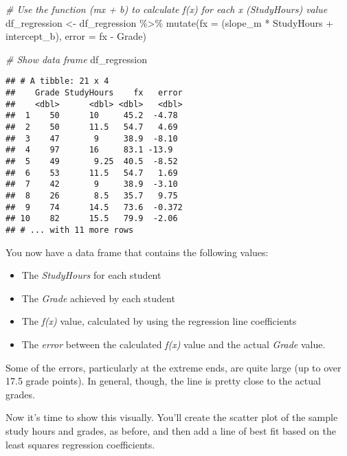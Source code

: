 \documentclass[
]{article}
\newenvironment{Shaded}{\begin{snugshade}}{\end{snugshade}}
\newcommand{\AttributeTok}[1]{\textcolor[rgb]{0.77,0.63,0.00}{#1}}
\newcommand{\CommentTok}[1]{\textcolor[rgb]{0.56,0.35,0.01}{\textit{#1}}}
\newcommand{\FunctionTok}[1]{\textcolor[rgb]{0.00,0.00,0.00}{#1}}
\newcommand{\NormalTok}[1]{#1}
\newcommand{\OtherTok}[1]{\textcolor[rgb]{0.56,0.35,0.01}{#1}}
\newcommand{\SpecialCharTok}[1]{\textcolor[rgb]{0.00,0.00,0.00}{#1}}
\providecommand{\tightlist}{%
  \setlength{\itemsep}{0pt}\setlength{\parskip}{0pt}}
\begin{document}
\begin{Shaded}
\begin{Highlighting}[]
\CommentTok{\# Use the function (mx + b) to calculate f(x) for each x (StudyHours) value}
\NormalTok{df\_regression }\OtherTok{\textless{}{-}}\NormalTok{ df\_regression }\SpecialCharTok{\%\textgreater{}\%} 
  \FunctionTok{mutate}\NormalTok{(}\AttributeTok{fx =}\NormalTok{ (slope\_m }\SpecialCharTok{*}\NormalTok{ StudyHours }\SpecialCharTok{+}\NormalTok{ intercept\_b),}
         \AttributeTok{error =}\NormalTok{ fx }\SpecialCharTok{{-}}\NormalTok{ Grade)}


\CommentTok{\# Show data frame}
\NormalTok{df\_regression}
\end{Highlighting}
\end{Shaded}

\begin{verbatim}
## # A tibble: 21 x 4
##    Grade StudyHours    fx   error
##    <dbl>      <dbl> <dbl>   <dbl>
##  1    50      10     45.2  -4.78 
##  2    50      11.5   54.7   4.69 
##  3    47       9     38.9  -8.10 
##  4    97      16     83.1 -13.9  
##  5    49       9.25  40.5  -8.52 
##  6    53      11.5   54.7   1.69 
##  7    42       9     38.9  -3.10 
##  8    26       8.5   35.7   9.75 
##  9    74      14.5   73.6  -0.372
## 10    82      15.5   79.9  -2.06 
## # ... with 11 more rows
\end{verbatim}

You now have a data frame that contains the following values:

\begin{itemize}
\tightlist
\item
  The \emph{StudyHours} for each student
\item
  The \emph{Grade} achieved by each student
\item
  The \emph{f(x)} value, calculated by using the regression line
  coefficients
\item
  The \emph{error} between the calculated \emph{f(x)} value and the
  actual \emph{Grade} value.
\end{itemize}

Some of the errors, particularly at the extreme ends, are quite large
(up to over 17.5 grade points). In general, though, the line is pretty
close to the actual grades.

Now it's time to show this visually. You'll create the scatter plot of
the sample study hours and grades, as before, and then add a line of
best fit based on the least squares regression coefficients.
\end{document}
